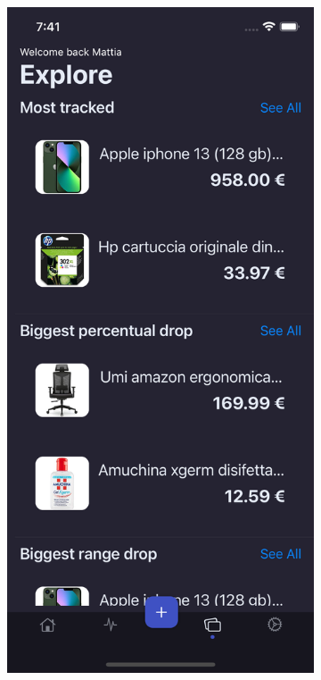 \begin{figure}[h!]
        \centering
        \begin{subfigure}[b]{0.3\textwidth}
            \centering
            \includegraphics[width=\textwidth]{images/interfaces/explore_screen.png}

\end{subfigure}
\end{figure}
